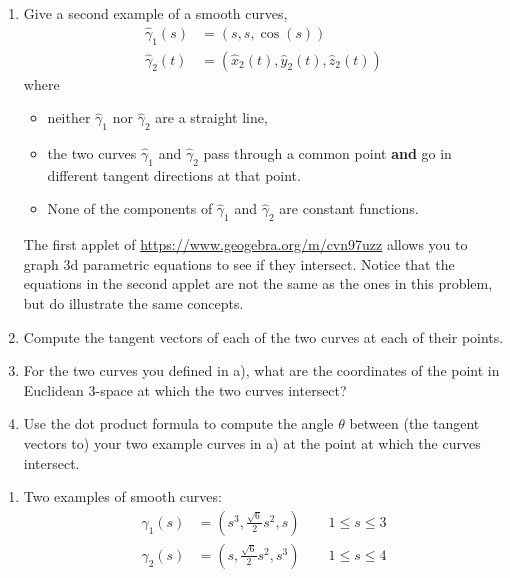 \documentclass[newpage,hints,handout]{ximera}
\begin{document}
\begin{problem}\hfil
\begin{enumerate}
\label{1}\item Give a second example of a smooth curves,
\begin{align*}
\hat{\gamma}_{1}(s) &=\left(s,s,\cos(s)\right) \\
\hat{\gamma}_{2}(t) &=\left(\hat{x}_{2}(t),\hat{y}_{2}(t),\hat{z}_{2}(t)\right)
\end{align*}
where
\begin{itemize}
\item neither $\hat{\gamma}_1$ nor $\hat{\gamma}_2$ are a straight line,
\item the two curves $\hat{\gamma}_1$ and $\hat{\gamma}_2$ pass through a common
  point \textbf{and} go in different tangent directions at that point.
\item None of the components of $\hat{\gamma}_1$ and $\hat{\gamma}_2$ are
  constant functions.
\end{itemize}
The first applet of \url{https://www.geogebra.org/m/cvn97uzz} allows you to graph 3d parametric equations to see if they intersect. Notice that the equations in the second applet are not the same as the ones in this problem, but do illustrate the same concepts.

\item Compute the tangent vectors of each of the two curves at each of their
  points.

\item For the two curves you defined in a), what are the coordinates of the
  point in Euclidean $3$-space at which the two curves intersect?

\item Use the dot product formula to compute the angle $\theta$ between (the
tangent vectors to) your two example curves in a) at the point at which the
curves intersect. %
\end{enumerate}


\begin{freeResponse} 
\begin{enumerate}
\label{1}\item Two examples of smooth curves:
\begin{align*}
\hat{\gamma}_{1}(s) &=\left(s^3, \frac{\sqrt{6}}{2}s^2, s\right) \qquad 1 \leq s\leq3 \\
\hat{\gamma}_{2}(s) &=\left(s, \frac{\sqrt{6}}{2}s^2, s^3\right) \qquad 1 \leq s\leq4
\end{align*}


\end{enumerate}
\end{freeResponse}
\end{problem}
\end{document}
